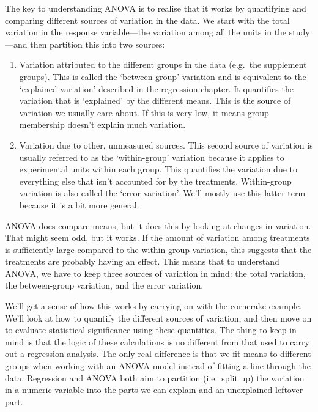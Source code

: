 \documentclass[
]{book}
\begin{document}
The key to understanding ANOVA is to realise that it works by quantifying and comparing different sources of variation in the data. We start with the total variation in the response variable---the variation among all the units in the study---and then partition this into two sources:

\begin{enumerate}
\def\labelenumi{\arabic{enumi}.}
\item
  Variation attributed to the different groups in the data (e.g.~the supplement groups). This is called the `between-group' variation and is equivalent to the `explained variation' described in the regression chapter. It quantifies the variation that is `explained' by the different means. This is the source of variation we usually care about. If this is very low, it means group membership doesn't explain much variation.
\item
  Variation due to other, unmeasured sources. This second source of variation is usually referred to as the `within-group' variation because it applies to experimental units within each group. This quantifies the variation due to everything else that isn't accounted for by the treatments. Within-group variation is also called the `error variation'. We'll mostly use this latter term because it is a bit more general.
\end{enumerate}

ANOVA does compare means, but it does this by looking at changes in variation. That might seem odd, but it works. If the amount of variation among treatments is sufficiently large compared to the within-group variation, this suggests that the treatments are probably having an effect. This means that to understand ANOVA, we have to keep three sources of variation in mind: the total variation, the between-group variation, and the error variation.

We'll get a sense of how this works by carrying on with the corncrake example. We'll look at how to quantify the different sources of variation, and then move on to evaluate statistical significance using these quantities. The thing to keep in mind is that the logic of these calculations is no different from that used to carry out a regression analysis. The only real difference is that we fit means to different groups when working with an ANOVA model instead of fitting a line through the data. Regression and ANOVA both aim to partition (i.e.~split up) the variation in a numeric variable into the parts we can explain and an unexplained leftover part.
\end{document}
